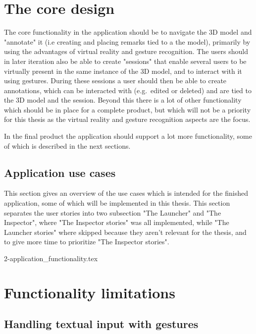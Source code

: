 \section{The core design} 
The core functionality in the application should be to navigate the 3D model and "annotate" it (i.e creating and placing remarks tied to a the model), 
primarily by using the advantages of virtual reality and gesture recognition. 
The users should in later iteration also be able to create "sessions" that enable several users to be virtually present 
in the same instance of the 3D model, and to interact with it using gestures. During these sessions a user should then be able to create annotations, 
which can be interacted with (e.g.~edited or deleted) and are tied to the 3D model and the session. 
Beyond this there is a lot of other functionality which should be in place for a complete product, but which will not be a priority 
for this thesis as the virtual reality and gesture recognition aspects are the focus. 

In the final product the application should support a lot more functionality, some of which is described in the next sections.


\subsection{Application use cases}
This section gives an overview of the use cases which is intended for the finished application, some of which will be implemented in this thesis. 
This section separates the user stories into two subsection "The Launcher" and "The Inspector", where "The Inspector stories" was all implemented, while
"The Launcher stories" where skipped because they aren't relevant for the thesis, and to give more time to prioritize "The Inspector stories".



{2-application_functionality.tex}

\section{Functionality limitations}

\subsection{Handling textual input with gestures}

